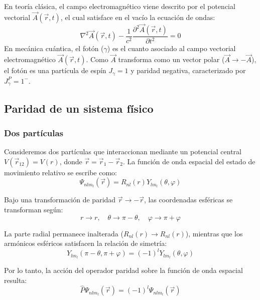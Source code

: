 En teoría clásica, el campo electromagnético viene descrito por el potencial vectorial $\vec{A}(\vec{r}, t)$, el cual satisface en el vacío la ecuación de ondas:
\begin{equation}
    \nabla^2 \vec{A}(\vec{r},t) - \frac{1}{c^2}\frac{\partial^2 \vec{A}(\vec{r},t)}{\partial t^2} = 0
\end{equation}
En mecánica cuántica, el fotón ($\gamma$) es el cuanto asociado al campo vectorial electromagnético $\vec{A}(\vec{r},t)$. Como $\vec{A}$ transforma como un vector polar ($\vec{A} \to -\vec{A}$), el fotón es una partícula de espín $J_\gamma = 1$ y paridad negativa, caracterizado por $J_\gamma^P = 1^-$.

\subsection{Paridad de un sistema físico}

\subsubsection{Dos partículas}

Consideremos dos partículas que interaccionan mediante un potencial central $V(\vec{r}_{12}) = V(r)$, donde $\vec{r} = \vec{r}_1 - \vec{r}_2$. La función de onda espacial del estado de movimiento relativo se escribe como:
\begin{equation}
    \Psi_{nlm_l}(\vec{r}) = R_{nl}(r) Y_{lm_l}(\theta, \varphi)
\end{equation}

Bajo una transformación de paridad $\vec{r} \to -\vec{r}$, las coordenadas esféricas se transforman según:
\begin{equation}
    r \to r, \quad \theta \to \pi - \theta, \quad \varphi \to \pi + \varphi
\end{equation}

La parte radial permanece inalterada ($R_{nl}(r) \to R_{nl}(r)$), mientras que los armónicos esféricos satisfacen la relación de simetría:
\begin{equation}
    Y_{lm_l}(\pi - \theta, \pi + \varphi) = (-1)^l Y_{lm_l}(\theta, \varphi)
\end{equation}

Por lo tanto, la acción del operador paridad sobre la función de onda espacial resulta:
\begin{equation}
    \hat{P} \Psi_{nlm_l}(\vec{r}) = (-1)^l \Psi_{nlm_l}(\vec{r})
\end{equation}

